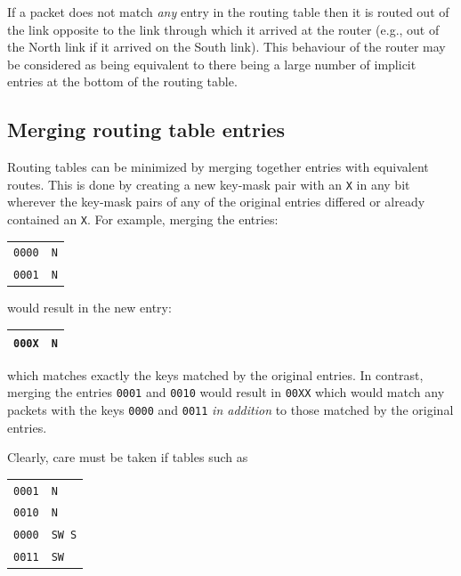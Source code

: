 \documentclass[conference]{IEEEtran}
\newcommand{\mytt}[1]{\texttt{\footnotesize#1}}
\begin{document}
  If a packet does not match \textit{any} entry in the routing table then it is routed out of the link opposite to the link through which it arrived at the router (e.g., out of the North link if it arrived on the South link).
  This behaviour of the router may be considered as being equivalent to there being a large number of implicit entries at the bottom of the routing table.

  \subsection{Merging routing table entries}

  Routing tables can be minimized by merging together entries with equivalent routes.
  This is done by creating a new key-mask pair with an \mytt{X} in any bit wherever the key-mask pairs of any of the original entries differed or already contained an \mytt{X}.
  For example, merging the entries:

  \begin{table}[H]
    \centering
    \begin{tabular}{c l}
      \toprule
      \texttt{0000} & \texttt{N}\\
      \texttt{0001} & \texttt{N}\\
      \bottomrule
    \end{tabular}
  \end{table}

  \noindent would result in the new entry:

  \begin{table}[H]
    \centering
    \begin{tabular}{c l}
      \toprule
      \texttt{000X} & \texttt{N}\\
      \bottomrule
    \end{tabular}
  \end{table}

  \noindent which matches exactly the keys matched by the original entries.
  In contrast, merging the entries \mytt{0001} and \mytt{0010} would result in \mytt{00XX} which would match any packets with the keys \mytt{0000} and \mytt{0011} \textit{in addition} to those matched by the original entries.

  Clearly, care must be taken if tables such as

  \begin{table}[H]
    \centering
    \begin{tabular}{c l}
      \toprule
      \texttt{0001} & \texttt{N}\\
      \texttt{0010} & \texttt{N}\\
      \texttt{0000} & \texttt{SW S}\\
      \texttt{0011} & \texttt{SW}\\
      \bottomrule
    \end{tabular}
  \end{table}
\end{document}

